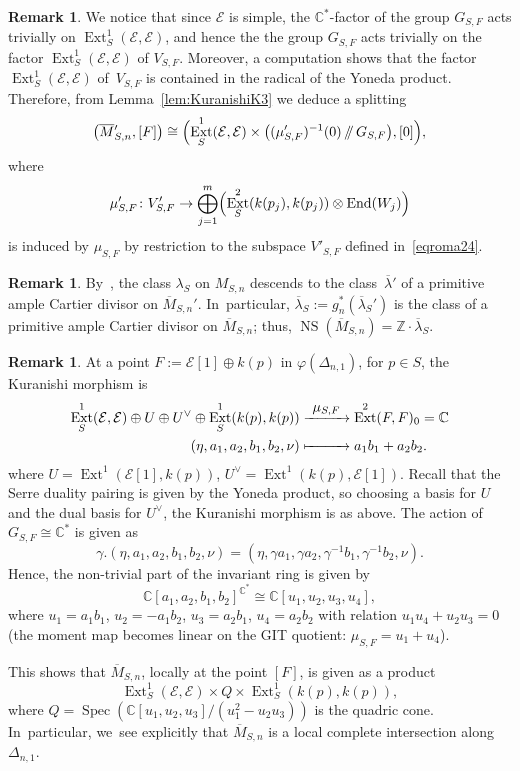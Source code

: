\documentclass[JEP,XML,SOM,Unicode,published]{cedram}
\newcommand\To[1]{\mathchoice{\xrightarrow{\textstyle\kern4pt#1\kern3pt}}{\stackrel{#1}{\longrightarrow}}{}{}}
\newcommand\Mto[1]{\mathrel{\mapstochar\To{#1}}}
\providecommand\sslash{\mathop{/\mkern-5.5mu/}}
\newcommand{\CC}{{\mathbb C}}\let\C\CC
\newcommand{\ZZ}{{\mathbb Z}}\let\Z\ZZ
\newcommand\cE{\mathcal{E}}
\DeclareMathOperator{\End}{End}
\DeclareMathOperator{\Ext}{Ext}
\DeclareMathOperator{\NS}{NS}
\DeclareMathOperator{\Spec}{Spec}
\let\phi\varphi
\theoremstyle{definition}
\newtheorem{rema}[lemm]{Remark}
\begin{document}
\begin{rema}\label{rmk:SplitKuranishi}
We notice that since $\cE$ is simple, the $\CC^*$-factor of the group $G_{S,F}$ acts trivially on $\Ext^1_S(\cE,\cE)$, and hence the the group $G_{S,F}$ acts trivially on the factor $\Ext^1_S(\cE,\cE)$ of $V_{S,F}$.
Moreover, a computation shows that the factor $\Ext^1_S(\cE,\cE)$ of~$V_{S,F}$ is contained in the radical of the Yoneda product.
Therefore, from Lemma~\ref{lem:KuranishiK3} we deduce a splitting
\begin{equation*}\label{eq:SplittingK3}
\left(\overline{M}{}_{S,n}',[F]\right)\cong \Bigl(\Ext^1_S(\cE,\cE)\times \bigl((\mu_{S,F}')^{-1}(0)\sslash G_{S,F}\bigr),[0]\Bigr),
\end{equation*}
where
\[
\mu_{S,F}'\colon V_{S,F}'\to \bigoplus_{j=1}^m \Bigl(\Ext^2_S(k(p_j),k(p_j))\otimes \End(W_j) \Bigr)
\]
is induced by $\mu_{S,F}$ by restriction to the subspace $V'_{S,F}$ defined in~\eqref{eqroma24}.
\end{rema}

\begin{rema}\label{rmk:AmpleLineBundleDUYK3}
By~\cite[Th.\,21.25]{BLMNPS:family}, the class $\lambda_S$ on $M_{S,n}$ descends to the class~$\overline{\lambda}{}'$ of a primitive ample Cartier divisor on $\overline{M}{}_{S,n}'$. In~particular, $\overline{\lambda}{}_S:=g_n^*(\overline{\lambda}{}_S')$ is the class of a primitive ample Cartier divisor on $\overline{M}_{S,n}$; thus, $\NS(\overline{M}_{S,n})=\ZZ \cdot \overline{\lambda}{}_S$.
\end{rema}

\begin{rema}\label{rmk:KuranishiDelta1}
At a point $F:=\cE[1] \oplus k(p)$ in $\phi(\Delta_{n,1})$, for $p\in S$, the Kuranishi morphism is
\[
\begin{aligned}
\Ext^1_S(\cE,\cE) \oplus U \oplus U^\vee \oplus \Ext^1_S(k(p),k(p)) & \To{\mu_{S,F}} \Ext^2(F,F)_0=\CC\\
(\eta, a_1,a_2,b_1,b_2, \nu) & \Mto{\hphantom{\mu_{S,F}}} a_1b_1+a_2b_2.
\end{aligned}
\]
where $U=\Ext^1(\cE[1],k(p))$, $U^\vee=\Ext^1(k(p),\cE[1])$. Recall that the Serre duality pairing is given by the Yoneda product, so choosing a basis for $U$ and the dual basis for $U^\vee$, the Kuranishi morphism is as above.
The action of $G_{S,F}\cong\CC^*$ is given as
\[
\gamma.(\eta,a_1,a_2,b_1,b_2,\nu)=(\eta,\gamma a_1,\gamma a_2,\gamma^{-1} b_1, \gamma^{-1} b_2,\nu).
\]
Hence, the non-trivial part of the invariant ring is given by
\[
\CC[a_1,a_2,b_1,b_2]^{\CC^*} \cong \CC[u_1,u_2,u_3,u_4],
\]
where $u_1=a_1b_1$, $u_2=-a_1b_2$, $u_3=a_2b_1$, $u_4=a_2b_2$ with relation $u_1u_4+u_2u_3=0$ (the moment map becomes linear on the GIT quotient: $\mu_{S,F}=u_1+u_4$).

This shows that $\overline{M}_{S,n}$, locally at the point $[F]$, is given as a product
\[
\Ext^1_S(\cE,\cE)\times Q \times \Ext^1_S(k(p),k(p)),
\]
where $Q=\Spec(\CC[u_1,u_2,u_3]/(u_1^2-u_2u_3))$ is the quadric cone. In~particular, we~see explicitly that $\overline{M}_{S,n}$ is a local complete intersection along $\Delta_{n,1}$.
\end{rema}
\end{document}
